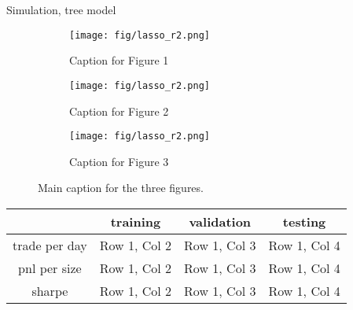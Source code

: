 \documentclass[10pt]{beamer}
\begin{document}
\begin{frame}{Simulation, tree model}


\begin{figure}[h!]
    \centering
    \begin{subfigure}[b]{0.3\textwidth}
        \centering
        \texttt{[image: fig/lasso\_r2.png]}
        \caption{Caption for Figure 1}
        \label{fig:figure1}
    \end{subfigure}
    \hfill
    \begin{subfigure}[b]{0.3\textwidth}
        \centering
        \texttt{[image: fig/lasso\_r2.png]}
        \caption{Caption for Figure 2}
        \label{fig:figure2}
    \end{subfigure}
    \hfill
    \begin{subfigure}[b]{0.3\textwidth}
        \centering
        \texttt{[image: fig/lasso\_r2.png]}
        \caption{Caption for Figure 3}
        \label{fig:figure3}
    \end{subfigure}
    \caption{Main caption for the three figures.}
    \label{fig:three_figures}
\end{figure}


\begin{table}[h!]
\centering
\begin{tabular}{c|c|c|c}
\hline
 & \textbf{training} & \textbf{validation} & \textbf{testing} \\ \hline
trade per day      & Row 1, Col 2      & Row 1, Col 3      & Row 1, Col 4      \\ \hline
pnl per size      & Row 1, Col 2      & Row 1, Col 3      & Row 1, Col 4      \\ \hline
sharpe      & Row 1, Col 2      & Row 1, Col 3      & Row 1, Col 4      \\ \hline
\end{tabular}
\end{table}


\end{frame}
\end{document}
